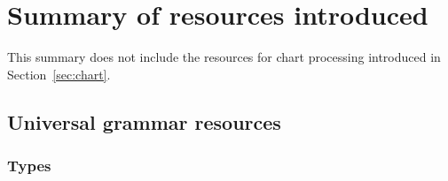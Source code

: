 

\clearpage

\section{Summary of resources introduced}

This summary does not include the resources for chart processing
introduced in Section~\ref{sec:chart}.

\subsection{Universal grammar resources} 

\subsubsection{Types}


